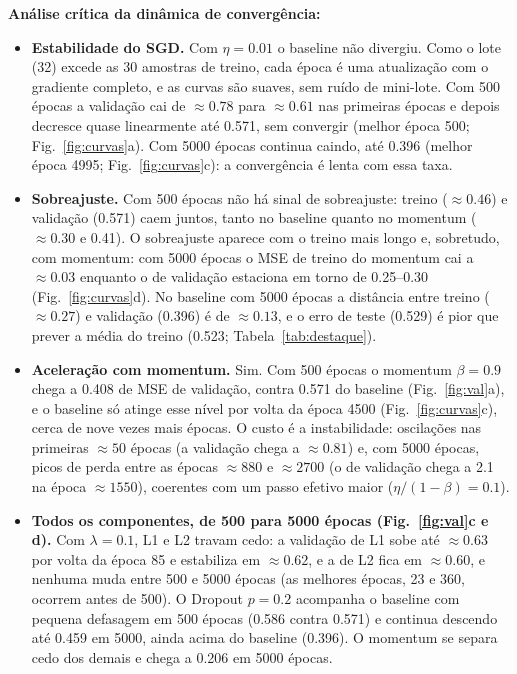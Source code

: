 \documentclass[11pt,a4paper]{article}
\begin{document}
\noindent\textbf{Análise crítica da dinâmica de convergência:}
\begin{itemize}
\item \textbf{Estabilidade do SGD.} Com $\eta=0.01$ o baseline não divergiu. Como o lote (32) excede as 30 amostras de treino, cada época é uma atualização com o gradiente completo, e as curvas são suaves, sem ruído de mini-lote. Com 500 épocas a validação cai de $\approx0.78$ para $\approx0.61$ nas primeiras épocas e depois decresce quase linearmente até 0.571, sem convergir (melhor época 500; Fig.~\ref{fig:curvas}a). Com 5000 épocas continua caindo, até 0.396 (melhor época 4995; Fig.~\ref{fig:curvas}c): a convergência é lenta com essa taxa.
\item \textbf{Sobreajuste.} Com 500 épocas não há sinal de sobreajuste: treino ($\approx0.46$) e validação (0.571) caem juntos, tanto no baseline quanto no momentum ($\approx0.30$ e 0.41). O sobreajuste aparece com o treino mais longo e, sobretudo, com momentum: com 5000 épocas o MSE de treino do momentum cai a $\approx0.03$ enquanto o de validação estaciona em torno de 0.25--0.30 (Fig.~\ref{fig:curvas}d). No baseline com 5000 épocas a distância entre treino ($\approx0.27$) e validação (0.396) é de $\approx0.13$, e o erro de teste (0.529) é pior que prever a média do treino (0.523; Tabela~\ref{tab:destaque}).
\item \textbf{Aceleração com momentum.} Sim. Com 500 épocas o momentum $\beta=0.9$ chega a 0.408 de MSE de validação, contra 0.571 do baseline (Fig.~\ref{fig:val}a), e o baseline só atinge esse nível por volta da época 4500 (Fig.~\ref{fig:curvas}c), cerca de nove vezes mais épocas. O custo é a instabilidade: oscilações nas primeiras $\approx50$ épocas (a validação chega a $\approx0.81$) e, com 5000 épocas, picos de perda entre as épocas $\approx880$ e $\approx2700$ (o de validação chega a 2.1 na época $\approx1550$), coerentes com um passo efetivo maior ($\eta/(1-\beta)=0.1$).
\item \textbf{Todos os componentes, de 500 para 5000 épocas (Fig.~\ref{fig:val}c e d).} Com $\lambda=0.1$, L1 e L2 travam cedo: a validação de L1 sobe até $\approx0.63$ por volta da época 85 e estabiliza em $\approx0.62$, e a de L2 fica em $\approx0.60$, e nenhuma muda entre 500 e 5000 épocas (as melhores épocas, 23 e 360, ocorrem antes de 500). O Dropout $p=0.2$ acompanha o baseline com pequena defasagem em 500 épocas (0.586 contra 0.571) e continua descendo até 0.459 em 5000, ainda acima do baseline (0.396). O momentum se separa cedo dos demais e chega a 0.206 em 5000 épocas.
\end{itemize}
\end{document}
